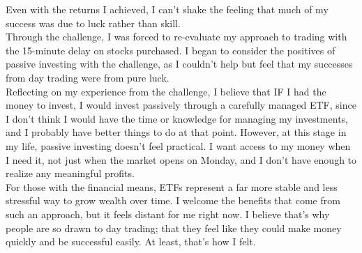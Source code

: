 \documentclass[a4paper, 12pt]{article}
\begin{document}
Even with the returns I achieved, I can't shake the feeling that 
much of my success was due to luck rather than skill. \\

Through the challenge, I was forced to re-evaluate my approach to trading with the 15-minute delay on stocks purchased. I began to consider the positives of passive investing with the challenge, as I couldn't help but feel that my successes from day trading were from pure luck. \\

Reflecting on my experience from the challenge, I believe that IF I had the
money to invest, I would invest passively through a carefully managed ETF, 
since I don't think I would have the time or knowledge for managing my
investments, and I probably have better things to do at that point. 
However, at this stage in my life, passive investing doesn't feel practical.
I want access to my money when I need it, not just when the market opens on
Monday, and I don't have enough to realize any meaningful profits. \\

For those with the financial means, ETFs represent a far more 
stable and less stressful way to grow wealth over time. 
I welcome the benefits that come from such an approach, 
but it feels distant for me right now. I believe that's why
people are so drawn to day trading; that they feel like they could
make money quickly and be successful easily. At least, that's how I felt.\\ 
\end{document}
